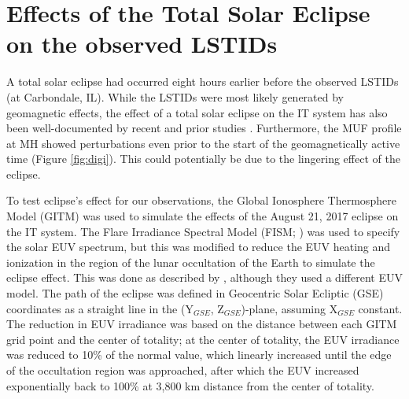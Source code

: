 \documentclass[crop=false,class=mitthesis,oneside,font=12pt]{standalone}
\begin{document}
\section{Effects of the Total Solar Eclipse on the observed LSTIDs}
A total solar eclipse had occurred eight hours earlier before the observed LSTIDs (at Carbondale, IL). While the LSTIDs were most likely generated by geomagnetic effects, the effect of a total solar eclipse on the IT system has also been well-documented by recent and prior studies  \citep[e.g.,][]{coster_gnss_2017,Mrak2018,liu_1998}. Furthermore, the MUF profile at  MH showed perturbations even prior to the start of the geomagnetically active time (Figure \ref{fig:digi}). This could potentially be due to the lingering effect of the eclipse.  

To test eclipse's effect for our observations, the Global Ionosphere Thermosphere Model (GITM) \citep{ridley_global_2006} was used to simulate the effects of the August 21, 2017 eclipse on the IT system. The Flare Irradiance Spectral Model (FISM; \cite{Chamberlin2007}) was used to specify the solar EUV spectrum, but this was modified to reduce the EUV heating and ionization in the region of the lunar occultation of the Earth to simulate the eclipse effect.
This was done as described by \citet{wu_gitm-data_2018}, although they used a different EUV model. The path of the eclipse was defined in Geocentric Solar Ecliptic (GSE) coordinates as a straight line in the (Y$_{GSE}$, Z$_{GSE}$)-plane, assuming X$_{GSE}$ constant. The reduction in EUV irradiance was based on the distance between each GITM grid point and the center of totality; at the center of totality, the EUV irradiance was reduced to 10\% of the normal value, which linearly increased until the edge of the occultation region was approached, after which the EUV increased exponentially back to 100\% at 3,800 km distance from the center of totality.
% 
% 
% 
\end{document}
